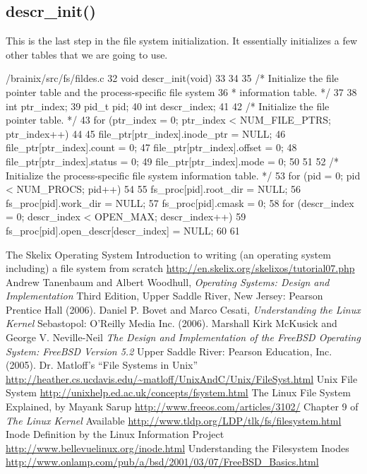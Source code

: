 \documentclass{article}
\begin{document}
\subsection{descr\_init()}

This is the last step in the file system initialization. It essentially initializes a few other tables that we are going to use.
\begin{code}{/brainix/src/fs/fildes.c}
32 void descr_init(void)
33 {
34 
35 /* Initialize the file pointer table and the process-specific file system
36  * information table. */
37 
38      int ptr_index;
39      pid_t pid;
40      int descr_index;
41 
42      /* Initialize the file pointer table. */
43      for (ptr_index = 0; ptr_index < NUM_FILE_PTRS; ptr_index++)
44      {
45           file_ptr[ptr_index].inode_ptr = NULL;
46           file_ptr[ptr_index].count = 0;
47           file_ptr[ptr_index].offset = 0;
48           file_ptr[ptr_index].status = 0;
49           file_ptr[ptr_index].mode = 0;
50      }
51 
52      /* Initialize the process-specific file system information table. */
53      for (pid = 0; pid < NUM_PROCS; pid++)
54      {
55           fs_proc[pid].root_dir = NULL;
56           fs_proc[pid].work_dir = NULL;
57           fs_proc[pid].cmask = 0;
58           for (descr_index = 0; descr_index < OPEN_MAX; descr_index++)
59                fs_proc[pid].open_descr[descr_index] = NULL;
60      }
61 }
\end{code}


\begin{thebibliography}{10}
 The Skelix Operating System Introduction to writing (an operating system including) a file system from scratch \url{http://en.skelix.org/skelixos/tutorial07.php}
 Andrew Tanenbaum and Albert Woodhull, \textit{Operating Systems: Design and Implementation} Third Edition, Upper Saddle River, New Jersey: Pearson Prentice Hall (2006).
 Daniel P. Bovet and Marco Cesati, \textit{Understanding the Linux Kernel} Sebastopol: O'Reilly Media Inc. (2006).
 Marshall Kirk McKusick and George V. Neville-Neil \textit{The Design and Implementation of the FreeBSD Operating System: FreeBSD Version 5.2} Upper Saddle River: Pearson Education, Inc. (2005).
 Dr. Matloff's ``File Systems in Unix'' \url{http://heather.cs.ucdavis.edu/~matloff/UnixAndC/Unix/FileSyst.html} 
 Unix File System \url{http://unixhelp.ed.ac.uk/concepts/fsystem.html}
 The Linux File System Explained, by Mayank Sarup \url{http://www.freeos.com/articles/3102/}
 Chapter 9 of \textit{The Linux Kernel} Available \url{http://www.tldp.org/LDP/tlk/fs/filesystem.html}
 Inode Definition by the Linux Information Project \url{http://www.bellevuelinux.org/inode.html}
 Understanding the Filesystem Inodes \url{http://www.onlamp.com/pub/a/bsd/2001/03/07/FreeBSD_Basics.html}
\end{thebibliography}
\end{document}
